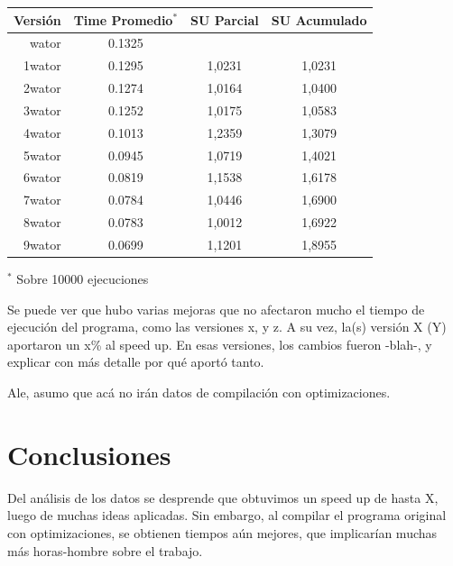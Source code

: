 \documentclass[a4paper,10pt]{article}
\begin{document}
\begin{center}
  \begin{tabular}{| r | c | c | c |}
    \hline
    Versi\'on	&   Time Promedio$^*$  &	SU Parcial	& 	SU Acumulado	\\ \hline \hline
    wator	&	0.1325		&       		&			\\ \hline
    1wator	&	0.1295		&   	1,0231		&	1,0231		\\ \hline
    2wator	&	0.1274		&	1,0164		&	1,0400		\\ \hline
    3wator	&	0.1252		&	1,0175		&	1,0583		\\ \hline
    4wator	&	0.1013		&	1,2359		&	1,3079		\\ \hline
    5wator	&	0.0945		&	1,0719		&	1,4021		\\ \hline
    6wator	&	0.0819		&	1,1538		&	1,6178		\\ \hline
    7wator	&	0.0784		&	1,0446		&	1,6900		\\ \hline
    8wator	&	0.0783		&	1,0012		&	1,6922		\\ \hline
    9wator	&	0.0699		&	1,1201		&	1,8955		\\ \hline

  \end{tabular}
\end{center}
	
	\small{$^*$ Sobre 10000 ejecuciones}
	
\bigskip

    Se puede ver que hubo varias mejoras que no afectaron mucho el tiempo de ejecuci\'on del programa, como las versiones x, y z. A su vez, la(s) versi\'on X (Y) aportaron un x\% al speed up. En esas versiones, los cambios fueron -blah-, y explicar con m\'as detalle por qu\'e aport\'o tanto.

    
    
    
Ale, asumo que ac\'a no ir\'an datos de compilaci\'on con optimizaciones.


\section{Conclusiones}

    Del an\'alisis de los datos se desprende que obtuvimos un speed up de hasta X, luego de muchas ideas aplicadas. Sin embargo, al compilar el programa original con optimizaciones, se obtienen tiempos a\'un mejores, que implicar\'ian muchas m\'as horas-hombre sobre el trabajo.

\end{document}
